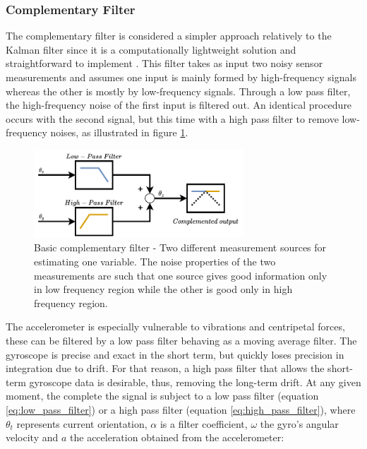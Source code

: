 
\subsubsection{Complementary Filter}

The complementary filter is considered a simpler approach relatively to the Kalman filter since it is a computationally lightweight solution and straightforward to implement \cite{higgins1975comparison}. This filter takes as input two noisy sensor measurements and assumes one input is mainly formed by high-frequency signals whereas the other is mostly by low-frequency signals. Through a low pass filter, the high-frequency noise of the first input is filtered out. An identical procedure occurs with the second signal, but this time with a high pass filter to remove low-frequency noises, as illustrated in figure \ref{fig:complementary}.

\begin{figure}[!h]
    \centering
    \includegraphics[width=0.7\textwidth]{figures/complementary.pdf}
    \caption{Basic complementary filter \cite{higgins1975comparison} - Two different measurement sources for estimating one variable. The noise properties of the two measurements are such that one source gives good information only in low frequency region while the other is good only in high frequency region. }
    \label{fig:complementary}
\end{figure}

The accelerometer is especially vulnerable to vibrations and centripetal forces, these can be filtered by a low pass filter behaving as a moving average filter. The gyroscope is precise and exact in the short term, but quickly loses precision in integration due to drift. For that reason, a high pass filter that allows the short-term gyroscope data is desirable, thus, removing the long-term drift.
At any given moment, the complete the signal is subject to a low pass filter (equation \ref{eq:low_pass_filter}) or a high pass filter (equation \ref{eq:high_pass_filter}), where $\theta_t$ represents current orientation, $\alpha$ is a filter coefficient, $\omega$ the gyro's angular velocity and $a$ the acceleration obtained from the accelerometer:

